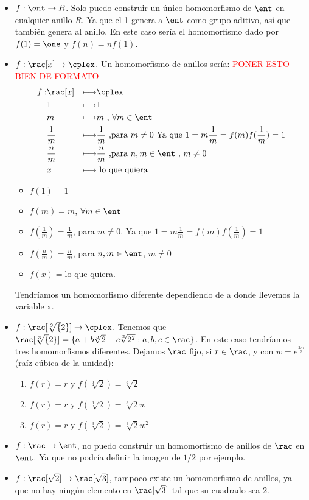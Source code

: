 \begin{example}
	\begin{itemize}
		\item $f:\ent \rightarrow R$. Solo puedo construir un único homomorfismo de $\ent$ en cualquier anillo $R$. Ya que el 1 genera a $\ent$ como grupo aditivo, así que también genera al anillo. En este caso sería el homomorfismo dado por $f(1)=\one$ y $f(n)=nf(1)$.
		\item $f: \rac[x] \rightarrow \cplex$. Un homomorfismo de anillos sería: \textcolor{red}{PONER ESTO BIEN DE FORMATO}
		\begin{align*}
			f: & \rac[x] & \longmapsto & \cplex \\
			& 1 & \longmapsto & 1\\
			& m & \longmapsto & m \text{ , } \forall m \in \ent\\
			& \frac{1}{m} & \longmapsto & \frac{1}{m} \text{ ,para } m\neq 0 \text{ Ya que } 1=m\frac{1}{m}=f(m)f(\frac{1}{m})=1\\
			& \frac{n}{m} & \longmapsto & \frac{n}{m} \text{ ,para }n,m \in \ent \text{ , } m\neq 0\\
			& x & \longmapsto & \text{ lo que quiera }\\
		\end{align*}
		\begin{itemize}
			\item $f(1)=1$
			\item $f(m)=m$, $\forall m \in \ent$
			\item $f(\frac{1}{m})=\frac{1}{m}$, para $m\neq 0$. Ya que $1=m\frac{1}{m}=f(m)f(\frac{1}{m})=1$
			\item $f(\frac{n}{m})=\frac{n}{m}$, para $n,m \in \ent$, $m\neq 0$
			\item $f(x)=$lo que quiera.
		\end{itemize}
		 Tendríamos un homomorfismo diferente dependiendo de a donde llevemos la variable x.
		 \item $f: \rac[\sqrt[3]{2}]\rightarrow \cplex$. Tenemos que $\rac[\sqrt[3]{2}] = \{a+b\sqrt[3]{2}+c\sqrt[3]{2^2}:a,b,c \in \rac\}$. En este caso tendríamos tres homomorfismos diferentes. Dejamos $\rac$ fijo, si $r\in \rac$, y con $w=e^{\frac{2\pi i}{3}}$ (raíz cúbica de la unidad):
		 \begin{enumerate}
		 	\item $f(r)=r$ y $f(\sqrt[3]{2})=\sqrt[3]{2}$
		 	\item $f(r)=r$ y $f(\sqrt[3]{2})=\sqrt[3]{2}w$
			 \item $f(r)=r$ y $f(\sqrt[3]{2})=\sqrt[3]{2}w^2$
		 \end{enumerate}
		 \item $f: \rac \rightarrow \ent$, no puedo construir un homomorfismo de anillos de $\rac$ en $\ent$. Ya que no podría definir la imagen de $1/2$ por ejemplo.
		 \item $f: \rac[\sqrt{2}]\rightarrow \rac[\sqrt{3}]$, tampoco existe un homomorfismo de anillos, ya que no hay ningún elemento en $\rac[\sqrt{3}]$ tal que su cuadrado sea 2.
	\end{itemize}
\end{example}

